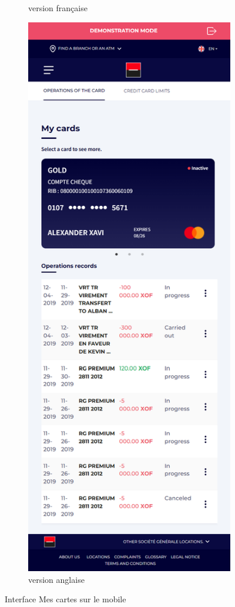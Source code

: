 \begin{figure}[!ht]
\begin{subfigure}[b]{0.49\textwidth}
        \caption{version française}
    \end{subfigure}
    \hfill
    \begin{subfigure}[b]{0.49\textwidth}
        \centering
        \includegraphics[width=\textwidth]{images/screens/cards/mob.png}
        \caption{version anglaise}
    \end{subfigure}
       \caption{Interface Mes cartes sur le mobile}
\end{figure}

